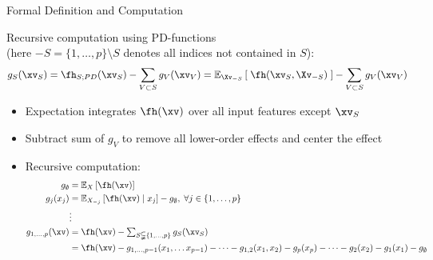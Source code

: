 \documentclass[11pt,compress,t,notes=noshow, aspectratio=169, xcolor=table]{beamer}
\newcommand{\open}{}
\newcommand{\close}{}
\begin{document}
\begin{frame}{Formal Definition and Computation
}

\begin{definition}
    Recursive computation using PD-functions \\
    (here $-S = \{1, \ldots, p \} \setminus S$ denotes all indices not contained in \(S\)):
    $$
    g_{S}(\xv_S)
    = \fh_{S;PD}(\xv_S) - \sum_{V \subset S} g_V(\xv_V)
    = \mathbb{E}_{\Xv_{-S}} \left[ \; \fh(\xv_S, \Xv_{-S}) \; \right] - \sum_{V \subset S} g_V(\xv_V)
    $$
\end{definition}

\begin{itemize}
    \item Expectation integrates $\fh(\xv)$ over all input features except $\xv_S$
    \item Subtract sum of $g_V$ to remove all lower-order effects and center the effect
\pause
\item Recursive computation:
\begin{align*}
 g_{\open \emptyset \close} &= \mathbb{E}_X\left[\fh(\xv)\right] \\
 g_{\open j \close}(x_j) &= \mathbb{E}_{X_{-j}}\left[\fh(\xv) \; \vert  \; x_j \right] - g_{\open \emptyset \close}, \; \forall j \in \{1, \ldots, p\} \\%
 &\vdots \\
 g_{\open 1, \dots, p \close}(\xv)
 &= \fh(\xv) -
 \textstyle\sum_{S \subsetneqq \{1,\ldots,p\}} g_{S}(\xv_S) \\
 &= \fh(\xv) -
 g_{\open 1, \dots, p-1 \close}(x_{1}, \dots x_{p-1}) - \dots - g_{\open 1, 2 \close}(x_1, x_2)
 - g_{\open p \close}(x_p)  - \dots - g_{\open 2 \close}(x_2) - g_{\open 1 \close}(x_1) - g_{\open \emptyset \close}
\end{align*}

\end{itemize}
        
\end{frame}
\end{document}
